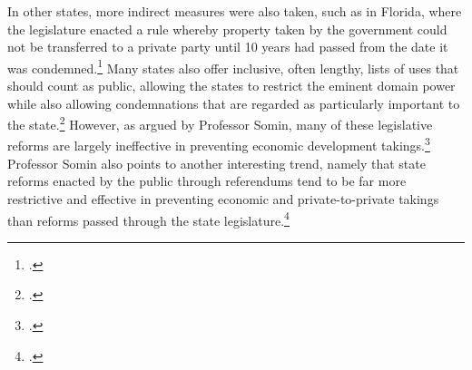In other states, more indirect measures were also taken, such as in Florida, where the legislature enacted a rule whereby property taken by the government could not be transferred to a private party until 10 years had passed from the date it was condemned.\footcite[809]{eagle08} Many states also offer inclusive, often lengthy, lists of uses that should count as public, allowing the states to restrict the eminent domain power while also allowing condemnations that are regarded as particularly important to the state.\footcite[804]{eagle08}
However, as argued by Professor Somin, many of these legislative reforms are largely ineffective in preventing economic development takings.\footcite[2120]{somin09} Professor Somin also points to another interesting trend, namely that state reforms enacted by the public  through referendums tend to be far more restrictive and effective in preventing economic and private-to-private takings than reforms passed through the state legislature.\footcite[2143]{somin09} 

